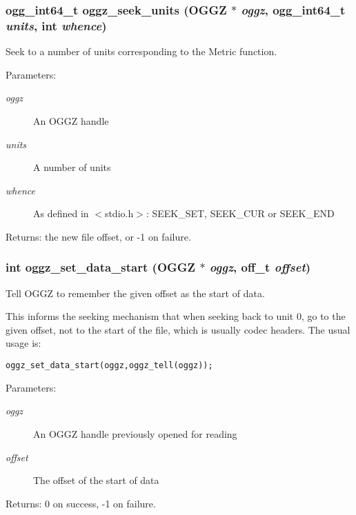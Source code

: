 \subsubsection{\setlength{\rightskip}{0pt plus 5cm}ogg\_\-int64\_\-t oggz\_\-seek\_\-units ({\bf OGGZ} $\ast$ {\em oggz}, ogg\_\-int64\_\-t {\em units}, int {\em whence})}\label{group__seek__api_ga4}


Seek to a number of units corresponding to the Metric function. 

\begin{Desc}
\item[Parameters:]
\begin{description}
\item[{\em oggz}]An OGGZ handle \item[{\em units}]A number of units \item[{\em whence}]As defined in $<$stdio.h$>$: SEEK\_\-SET, SEEK\_\-CUR or SEEK\_\-END \end{description}
\end{Desc}
\begin{Desc}
\item[Returns:]the new file offset, or -1 on failure. \end{Desc}
\subsubsection{\setlength{\rightskip}{0pt plus 5cm}int oggz\_\-set\_\-data\_\-start ({\bf OGGZ} $\ast$ {\em oggz}, off\_\-t {\em offset})}\label{group__seek__api_ga6}


Tell OGGZ to remember the given offset as the start of data. 

This informs the seeking mechanism that when seeking back to unit 0, go to the given offset, not to the start of the file, which is usually codec headers. The usual usage is: \small\begin{alltt}
    oggz\_set\_data\_start (oggz, oggz\_tell (oggz));
\end{alltt}\normalsize 
 \begin{Desc}
\item[Parameters:]
\begin{description}
\item[{\em oggz}]An OGGZ handle previously opened for reading \item[{\em offset}]The offset of the start of data \end{description}
\end{Desc}
\begin{Desc}
\item[Returns:]0 on success, -1 on failure. \end{Desc}
